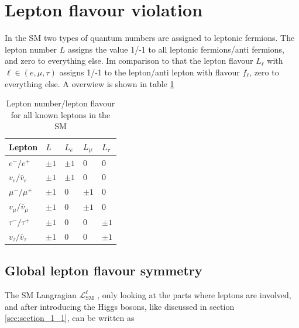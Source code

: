 \section{Lepton flavour violation}
\label{sec:section_1_3}

In the \acs{SM} two types of quantum numbers are assigned to leptonic fermions. The lepton number $L$ assigns the value 1/-1 to all leptonic fermions/anti fermions, and zero to everything else. Im comparison to that the lepton flavour $L_{\ell}$ with $\ell \in (e, \mu, \tau)$ assigns 1/-1 to the lepton/anti lepton with flavour $f_{\ell}$, zero to everything else. A overwiew is shown in table \ref{tab:tab_1_2}


\begin{table}[h]
	\centering
	\caption[Lepton number/lepton flavour of leptons]{Lepton number/lepton flavour for all known leptons in the \acs{SM}}
	\label{tab:tab_1_2}

	\begin{tabular}{l|l|l|l|l}
		Lepton				&$L$		&$L_{e}$	&$L_{\mu}$	&$L_{\tau}$	\\ \hline
		
		$e^{-}/e^{+}$			&$\pm 1$	&$\pm 1$	&0		&0		\\

		$v_{e}/\bar{v}_{e}$		&$\pm 1$	&$\pm 1$	&0		&0		\\
		
		$\mu^{-}/\mu^{+}$		&$\pm 1$	&0		&$\pm 1$	&0		\\

		$v_{\mu}/\bar{v}_{\mu}$		&$\pm 1$	&0		&$\pm 1$	&0		\\
		
		$\tau^{-}/\tau^{+}$		&$\pm 1$	&0		&0		&$\pm 1$	\\

		$v_{\tau}/\bar{v}_{\tau}$	&$\pm 1$	&0		&0		&$\pm 1$	\\			
	\end{tabular}
\end{table}


\subsection{Global lepton flavour symmetry}
\label{sec:section_1_3_1}

The \acs{SM} Langragian $\mathcal{L}^{\ell}_{\text{SM}}$ \cite{Peskin, EWK}, only looking at the parts where leptons are involved, and after introducing the Higgs bosons, like discussed in section \ref{sec:section_1_1}, can be written as

